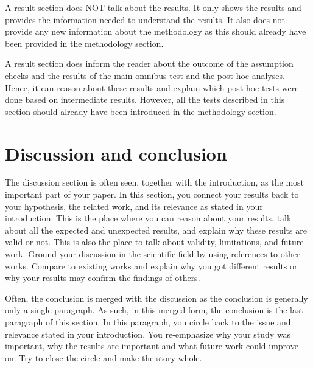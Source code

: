 \documentclass[10pt,a4paper]{article}
\begin{document}
A result section does NOT talk about the results. It only shows the results and provides the information needed to understand the results. It also does not provide any new information about the methodology as this should already have been provided in the methodology section. 

A result section does inform the reader about the outcome of the assumption checks and the results of the main omnibus test and the post-hoc analyses. Hence, it can reason about these results and explain which post-hoc tests were done based on intermediate results. However, all the tests described in this section should already have been introduced in the methodology section. 

\section{Discussion and conclusion}
The discussion section is often seen, together with the introduction, as the most important part of your paper. In this section, you connect your results back to your hypothesis, the related work, and its relevance as stated in your introduction. This is the place where you can reason about your results, talk about all the expected and unexpected results, and explain why these results are valid or not. This is also the place to talk about validity, limitations, and future work. Ground your discussion in the scientific field by using references to other works. Compare to existing works and explain why you got different results or why your results may confirm the findings of others. 

Often, the conclusion is merged with the discussion as the conclusion is generally only a single paragraph. As such, in this merged form, the conclusion is the last paragraph of this section. In this paragraph, you circle back to the issue and relevance stated in your introduction. You re-emphasize why your study was important, why the results are important and what future work could improve on. Try to close the circle and make the story whole.

\printbibliography
\end{document}
